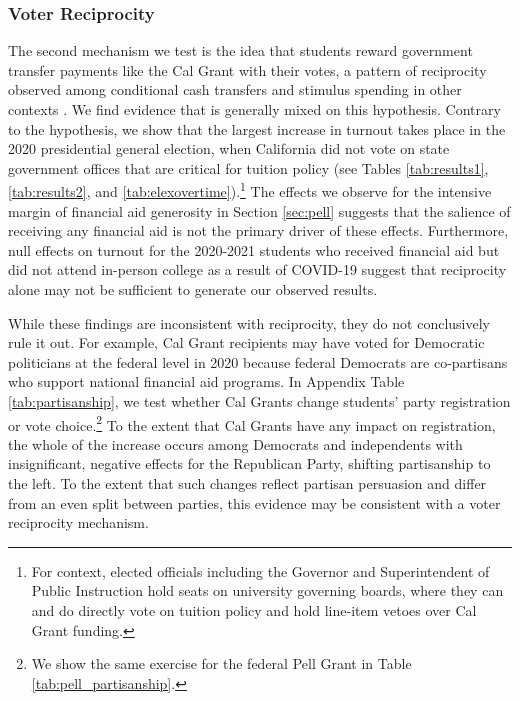 \documentclass[12pt,letterpaper,oneside]{book}
\begin{document}
\subsubsection{Voter Reciprocity}

The second mechanism we test is the idea that students reward government transfer payments like the Cal Grant with their votes, a pattern of reciprocity observed among conditional cash transfers and stimulus spending in other contexts \citep{manacorda_government_2011,pop-eleches_targeted_2012,huet-vaughn_stimulating_2019,firoozi_economic_2024}. We find evidence that is generally mixed on this hypothesis. Contrary to the hypothesis, we show that the largest increase in turnout takes place in the 2020 presidential general election, when California did not vote on state government offices that are critical for tuition policy (see Tables \ref{tab:results1}, \ref{tab:results2}, and \ref{tab:elexovertime}).\footnote{For context, elected officials including the Governor and Superintendent of Public Instruction hold seats on university governing boards, where they can and do directly vote on tuition policy and hold line-item vetoes over Cal Grant funding.} The effects we observe for the intensive margin of financial aid generosity in Section \ref{sec:pell} suggests that the salience of receiving any financial aid is not the primary driver of these effects. Furthermore, null effects on turnout for the 2020-2021 students who received financial aid but did not attend in-person college as a result of COVID-19 suggest that reciprocity alone may not be sufficient to generate our observed results.

While these findings are inconsistent with reciprocity, they do not conclusively rule it out. For example, Cal Grant recipients may have voted for Democratic politicians at the federal level in 2020 because federal Democrats are co-partisans who support national financial aid programs. In Appendix Table \ref{tab:partisanship}, we test whether Cal Grants change students' party registration or vote choice.\footnote{We show the same exercise for the federal Pell Grant in Table \ref{tab:pell_partisanship}.} To the extent that Cal Grants have any impact on registration, the whole of the increase occurs among Democrats and independents with insignificant, negative effects for the Republican Party, shifting partisanship to the left. To the extent that such changes reflect partisan persuasion and differ from an even split between parties, this evidence may be consistent with a voter reciprocity mechanism.
\end{document}
